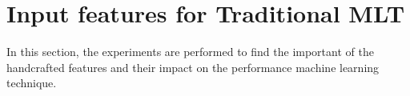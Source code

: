 \documentclass[12pt]{report} %
\begin{document}
%
%
%
%
%
%
%
%

\section{Input features for Traditional MLT}

In this section, the experiments are performed to find the important of the handcrafted features and their impact on the performance machine learning technique.
\end{document}
